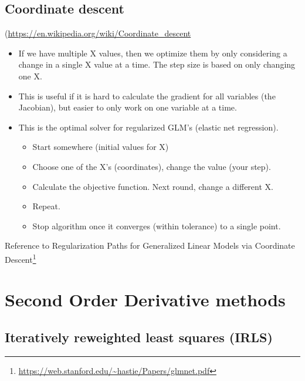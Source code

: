 \documentclass[fontset=fandol,zihao=false,scheme=chinese,heading=true,UTF8]{ctexbook}
\providecommand{\tightlist}{%
  \setlength{\itemsep}{0pt}\setlength{\parskip}{0pt}}
\renewcommand{\href}[2]{#2\footnote{\url{#1}}}
\begin{document}
\hypertarget{coordinate-descent}{%
\subsection{Coordinate descent}\label{coordinate-descent}}

(\url{https://en.wikipedia.org/wiki/Coordinate_descent}

\begin{itemize}
\tightlist
\item
  If we have multiple X values, then we optimize them by only considering a change in a single X value at a time. The step size is based on only changing one X.
\item
  This is useful if it is hard to calculate the gradient for all variables (the Jacobian), but easier to only work on one variable at a time.
\item
  This is the optimal solver for regularized GLM's (elastic net regression).

  \begin{itemize}
  \tightlist
  \item
    Start somewhere (initial values for X)
  \item
    Choose one of the X's (coordinates), change the value (your step).
  \item
    Calculate the objective function. Next round, change a different X.
  \item
    Repeat.
  \item
    Stop algorithm once it converges (within tolerance) to a single point.
  \end{itemize}
\end{itemize}

Reference to \href{https://web.stanford.edu/~hastie/Papers/glmnet.pdf}{Regularization Paths for Generalized Linear Models via Coordinate Descent}

\hypertarget{second-order-derivative-methods}{%
\section{Second Order Derivative methods}\label{second-order-derivative-methods}}

\hypertarget{iteratively-reweighted-least-squares-irls}{%
\subsection{Iteratively reweighted least squares (IRLS)}\label{iteratively-reweighted-least-squares-irls}}
\end{document}
